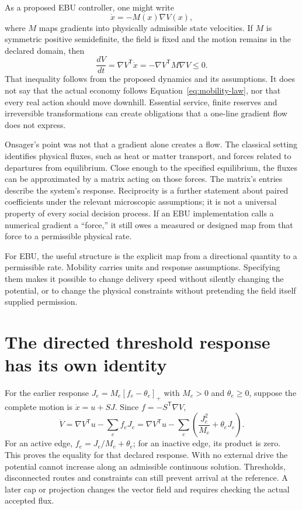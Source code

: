 As a proposed EBU controller, one might write
\begin{equation}\label{eq:mobility-law}
 \dot x=-M(x)\nabla V(x),
\end{equation}
where $M$ maps gradients into physically admissible state velocities. If $M$ is symmetric positive semidefinite, the field is fixed and the motion remains in the declared domain, then
\begin{equation}
 \frac{dV}{dt}=\nabla V^{\mathsf T}\dot x
   =-\nabla V^{\mathsf T}M\nabla V\leq0.
\end{equation}
That inequality follows from the proposed dynamics and its assumptions. It does not say that the actual economy follows Equation~\ref{eq:mobility-law}, nor that every real action should move downhill. Essential service, finite reserves and irreversible transformations can create obligations that a one-line gradient flow does not express.

Onsager's point was not that a gradient alone creates a flow. The classical setting identifies physical fluxes, such as heat or matter transport, and forces related to departures from equilibrium. Close enough to the specified equilibrium, the fluxes can be approximated by a matrix acting on those forces. The matrix's entries describe the system's response. Reciprocity is a further statement about paired coefficients under the relevant microscopic assumptions; it is not a universal property of every social decision process. If an EBU implementation calls a numerical gradient a ``force,'' it still owes a measured or designed map from that force to a permissible physical rate.

For EBU, the useful structure is the explicit map from a directional quantity to a permissible rate. Mobility carries units and response assumptions. Specifying them makes it possible to change delivery speed without silently changing the potential, or to change the physical constraints without pretending the field itself supplied permission.

\section{The directed threshold response has its own identity}
For the earlier response $J_e=M_e[f_e-\theta_e]_+$ with $M_e>0$ and $\theta_e\geq0$, suppose the complete motion is $\dot x=u+SJ$. Since $f=-S^{\mathsf T}\nabla V$,
\begin{equation}
 \dot V=\nabla V^{\mathsf T}u-\sum_e f_eJ_e
 =\nabla V^{\mathsf T}u-\sum_e\left(\frac{J_e^2}{M_e}+\theta_eJ_e\right).
\end{equation}
For an active edge, $f_e=J_e/M_e+\theta_e$; for an inactive edge, its product is zero. This proves the equality for that declared response. With no external drive the potential cannot increase along an admissible continuous solution. Thresholds, disconnected routes and constraints can still prevent arrival at the reference. A later cap or projection changes the vector field and requires checking the actual accepted flux.

